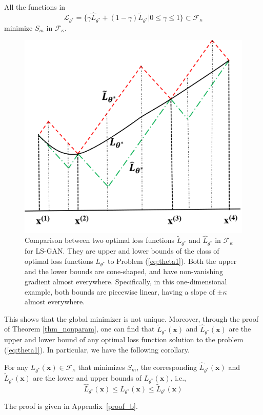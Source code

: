 \begin{corollary}
All the functions in
$$\mathcal L_{\theta^*}=\{\gamma \widehat L_{\theta^*} + (1-\gamma) \widetilde L_{\theta^*}|0\leq \gamma \leq 1\}\subset\mathcal F_\kappa$$
 minimize $S_{m}$ in $\mathcal F_\kappa$.
\end{corollary}

\begin{figure}[t!]
    \centering
        \includegraphics[width=0.5\linewidth]{fun_L.png}
        \caption{Comparison between two optimal loss functions $\widetilde L_{\theta^*}$ and $\widehat L_{\theta^*}$ in $\mathcal F_\kappa$ for LS-GAN. They are upper and lower bounds of the class of optimal loss functions $L_{\theta^*}$ to Problem (\ref{eq:theta1}). Both the upper and the lower bounds are cone-shaped, and have non-vanishing gradient almost everywhere. Specifically,
        in this one-dimensional example, both bounds are piecewise linear, having a slope of $\pm\kappa$ almost everywhere.}\label{fig:fun_L}
\end{figure}

This shows that the global minimizer is not unique. Moreover, through the proof of Theorem \ref{thm_nonparam}, one can find that $\widetilde L_{\theta^*}(\mathbf x)$ and $\widehat L_{\theta^*}(\mathbf x)$ are the upper and lower bound of any optimal loss function solution to the problem (\ref{eq:theta1}). In particular, we have the following corollary.
\begin{corollary}\label{cor2}
For any $L_{\theta^*}(\mathbf x)\in\mathcal F_\kappa$ that minimizes $S_{m}$, the corresponding $\widehat L_{\theta^*}(\mathbf x)$ and $\widetilde L_{\theta^*}(\mathbf x)$ are the lower and upper bounds of $L_{\theta^*}(\mathbf x)$, i.e.,
$$
\widehat L_{\theta^*}(\mathbf x) \leq L_{\theta^*}(\mathbf x) \leq \widetilde L_{\theta^*}(\mathbf x)
$$
\end{corollary}
The proof is given in Appendix~\ref{proof_b}.


